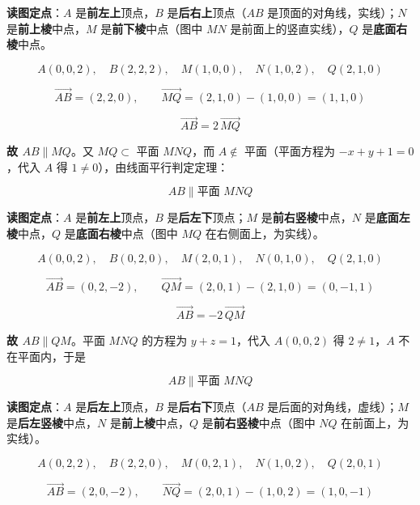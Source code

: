 \par\medskip


\textbf{读图定点}：$A$ 是\textbf{前左上}顶点，$B$ 是\textbf{后右上}顶点（$AB$ 是顶面的对角线，实线）；$N$ 是\textbf{前上棱}中点，$M$ 是\textbf{前下棱}中点（图中 $MN$ 是前面上的竖直实线），$Q$ 是\textbf{底面右棱}中点。

\[A(0,0,2),\quad B(2,2,2),\quad M(1,0,0),\quad N(1,0,2),\quad Q(2,1,0)\]

\[\overrightarrow{AB}=(2,2,0),\qquad \overrightarrow{MQ}=(2,1,0)-(1,0,0)=(1,1,0)\]

\[\overrightarrow{AB}=2\,\overrightarrow{MQ}\]

\textbf{故 $AB\parallel MQ$}。又 $MQ\subset$ 平面 $MNQ$，而 $A\notin$ 平面（平面方程为 $-x+y+1=0$，代入 $A$ 得 $1\ne0$），由线面平行判定定理：

\[AB\parallel\text{平面 }MNQ\]

\par\medskip


\textbf{读图定点}：$A$ 是\textbf{前左上}顶点，$B$ 是\textbf{后左下}顶点；$M$ 是\textbf{前右竖棱}中点，$N$ 是\textbf{底面左棱}中点，$Q$ 是\textbf{底面右棱}中点（图中 $MQ$ 在右侧面上，为实线）。

\[A(0,0,2),\quad B(0,2,0),\quad M(2,0,1),\quad N(0,1,0),\quad Q(2,1,0)\]

\[\overrightarrow{AB}=(0,2,-2),\qquad \overrightarrow{QM}=(2,0,1)-(2,1,0)=(0,-1,1)\]

\[\overrightarrow{AB}=-2\,\overrightarrow{QM}\]

\textbf{故 $AB\parallel QM$}。平面 $MNQ$ 的方程为 $y+z=1$，代入 $A(0,0,2)$ 得 $2\ne1$，$A$ 不在平面内，于是

\[AB\parallel\text{平面 }MNQ\]

\par\medskip


\textbf{读图定点}：$A$ 是\textbf{后左上}顶点，$B$ 是\textbf{后右下}顶点（$AB$ 是后面的对角线，虚线）；$M$ 是\textbf{后左竖棱}中点，$N$ 是\textbf{前上棱}中点，$Q$ 是\textbf{前右竖棱}中点（图中 $NQ$ 在前面上，为实线）。

\[A(0,2,2),\quad B(2,2,0),\quad M(0,2,1),\quad N(1,0,2),\quad Q(2,0,1)\]

\[\overrightarrow{AB}=(2,0,-2),\qquad \overrightarrow{NQ}=(2,0,1)-(1,0,2)=(1,0,-1)\]

